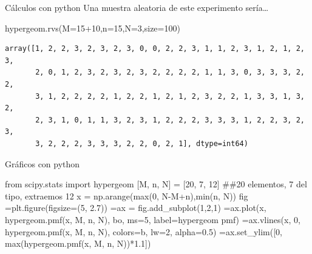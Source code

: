 \documentclass[
  ignorenonframetext,
  aspectratio=169]{beamer}
\newenvironment{Shaded}{\begin{snugshade}}{\end{snugshade}}
\newcommand{\BuiltInTok}[1]{\textcolor[rgb]{0.00,0.23,0.31}{#1}}
\newcommand{\CommentTok}[1]{\textcolor[rgb]{0.37,0.37,0.37}{#1}}
\newcommand{\DecValTok}[1]{\textcolor[rgb]{0.68,0.00,0.00}{#1}}
\newcommand{\FloatTok}[1]{\textcolor[rgb]{0.68,0.00,0.00}{#1}}
\newcommand{\ImportTok}[1]{\textcolor[rgb]{0.00,0.46,0.62}{#1}}
\newcommand{\NormalTok}[1]{\textcolor[rgb]{0.00,0.23,0.31}{#1}}
\newcommand{\OperatorTok}[1]{\textcolor[rgb]{0.37,0.37,0.37}{#1}}
\newcommand{\StringTok}[1]{\textcolor[rgb]{0.13,0.47,0.30}{#1}}
\begin{document}
\begin{frame}[fragile]{Cálculos con python}
\protect\hypertarget{cuxe1lculos-con-python-12}{}
Una muestra aleatoria de este experimento sería\ldots{}

\begin{Shaded}
\begin{Highlighting}[]
\NormalTok{hypergeom.rvs(M}\OperatorTok{=}\DecValTok{15}\OperatorTok{+}\DecValTok{10}\NormalTok{,n}\OperatorTok{=}\DecValTok{15}\NormalTok{,N}\OperatorTok{=}\DecValTok{3}\NormalTok{,size}\OperatorTok{=}\DecValTok{100}\NormalTok{)}
\end{Highlighting}
\end{Shaded}

\begin{verbatim}
array([1, 2, 2, 3, 2, 3, 2, 3, 0, 0, 2, 2, 3, 1, 1, 2, 3, 1, 2, 1, 2, 3,
       2, 0, 1, 2, 3, 2, 3, 2, 3, 2, 2, 2, 2, 1, 1, 3, 0, 3, 3, 3, 2, 2,
       3, 1, 2, 2, 2, 2, 1, 2, 2, 1, 2, 1, 2, 3, 2, 2, 1, 3, 3, 1, 3, 2,
       2, 3, 1, 0, 1, 1, 3, 2, 3, 1, 2, 2, 2, 3, 3, 3, 1, 2, 2, 3, 2, 3,
       3, 2, 2, 2, 3, 3, 3, 2, 2, 0, 2, 1], dtype=int64)
\end{verbatim}
\end{frame}

\begin{frame}[fragile]{Gráficos con python}
\protect\hypertarget{gruxe1ficos-con-python-5}{}
\begin{Shaded}
\begin{Highlighting}[]
\ImportTok{from}\NormalTok{ scipy.stats }\ImportTok{import}\NormalTok{ hypergeom}
\NormalTok{[M, n, N] }\OperatorTok{=}\NormalTok{ [}\DecValTok{20}\NormalTok{, }\DecValTok{7}\NormalTok{, }\DecValTok{12}\NormalTok{] }\CommentTok{\#\#20 elementos, 7 del tipo, extraemos 12}
\NormalTok{x }\OperatorTok{=}\NormalTok{ np.arange(}\BuiltInTok{max}\NormalTok{(}\DecValTok{0}\NormalTok{, N}\OperatorTok{{-}}\NormalTok{M}\OperatorTok{+}\NormalTok{n),}\BuiltInTok{min}\NormalTok{(n, N))}
\NormalTok{fig }\OperatorTok{=}\NormalTok{plt.figure(figsize}\OperatorTok{=}\NormalTok{(}\DecValTok{5}\NormalTok{, }\FloatTok{2.7}\NormalTok{))}
 \OperatorTok{=}\NormalTok{ax }\OperatorTok{=}\NormalTok{ fig.add\_subplot(}\DecValTok{1}\NormalTok{,}\DecValTok{2}\NormalTok{,}\DecValTok{1}\NormalTok{)}
 \OperatorTok{=}\NormalTok{ax.plot(x, hypergeom.pmf(x, M, n, N), }\StringTok{\textquotesingle{}bo\textquotesingle{}}\NormalTok{, ms}\OperatorTok{=}\DecValTok{5}\NormalTok{, label}\OperatorTok{=}\StringTok{\textquotesingle{}hypergeom pmf\textquotesingle{}}\NormalTok{)}
 \OperatorTok{=}\NormalTok{ax.vlines(x, }\DecValTok{0}\NormalTok{, hypergeom.pmf(x, M, n, N), colors}\OperatorTok{=}\StringTok{\textquotesingle{}b\textquotesingle{}}\NormalTok{, lw}\OperatorTok{=}\DecValTok{2}\NormalTok{, alpha}\OperatorTok{=}\FloatTok{0.5}\NormalTok{)}
 \OperatorTok{=}\NormalTok{ax.set\_ylim([}\DecValTok{0}\NormalTok{, }\BuiltInTok{max}\NormalTok{(hypergeom.pmf(x, M, n, N))}\OperatorTok{*}\FloatTok{1.1}\NormalTok{])}
\end{Highlighting}
\end{Shaded}
\end{frame}
\end{document}
